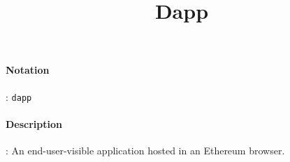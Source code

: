 \documentclass[10pt,a4paper,oneside]{scrartcl}
\author{}
\title{Dapp}
\date{}
\begin{document}
\maketitle
\paragraph{Notation}: \texttt{dapp}
\paragraph{Description}: An end-user-visible application hosted in an Ethereum browser. 
\end{document}
